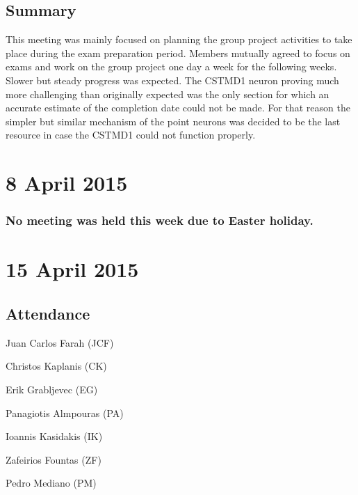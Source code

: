 \documentclass[a4paper,11pt]{article}
\begin{document}
\subsection*{Summary}
This meeting was mainly focused on planning the group project activities to take place during the exam preparation period. Members mutually agreed to focus on exams and work on the group project one day a week for the following weeks. Slower but steady progress was expected.  The CSTMD1 neuron proving much more challenging than originally expected was the only section for which an accurate estimate of the completion date could not be made. For that reason the simpler but similar mechanism of the point neurons was decided to be the last resource in case the CSTMD1 could not function properly.

\maketitle
\section*{8 April 2015}
\subsubsection*{No meeting was held this week due to Easter holiday.}

\maketitle
\section*{15 April 2015}
\subsection*{Attendance}
\begin{compactenum}
\item Juan Carlos Farah (JCF)
\item Christos Kaplanis (CK)
\item Erik Grabljevec (EG)
\item Panagiotis Almpouras (PA)
\item Ioannis Kasidakis (IK)
\item Zafeirios Fountas (ZF)
\item Pedro Mediano (PM)
\end{compactenum}
\end{document}

